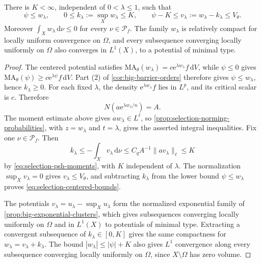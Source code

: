 \begin{lemma}\label{lem:selection-centered-bounds}
There is $K<\infty$, independent of $0<\lambda\leq1$, such that
\begin{equation}\label{eq:selection-centered-bounds}
 \psi\leq w_\lambda,\qquad
 0\leq k_\lambda:=\sup_Xw_\lambda\leq K,\qquad
 \psi-K\leq v_\lambda:=w_\lambda-k_\lambda\leq V_\theta.
\end{equation}
Moreover $\int_Xw_\lambda\,\mathrm{d}\nu\leq0$ for every $\nu\in\mathcal P_f$. The family $w_\lambda$ is relatively compact for locally uniform convergence on $\Omega$, and every subsequence converging locally uniformly on $\Omega$ also converges in $L^1(X)$, to a potential of minimal type.
\end{lemma}
\begin{proof}
The centered potential satisfies $\mathrm{MA}_\theta(w_\lambda)=c\mathrm{e}^{\lambda w_\lambda}f\,\mathrm{d}V$, while $\psi\leq0$ gives $\mathrm{MA}_\theta(\psi)\geq c\mathrm{e}^{\lambda\psi}f\,\mathrm{d}V$. Part (2) of \cref{cor:big-barrier-orders} therefore gives $\psi\leq w_\lambda$, hence $k_\lambda\geq0$. For each fixed $\lambda$, the density $\mathrm{e}^{\lambda w_\lambda}f$ lies in $L^p$, and its critical scalar is $c$. Therefore
\[
 N(a\mathrm{e}^{\lambda w_\lambda/n})=A.
\]
The moment estimate above gives $aw_\lambda\in L^\ell$, so \cref{prop:selection-norming-probabilities}, with $z=w_\lambda$ and $t=\lambda$, gives the asserted integral inequalities. Fix one $\nu\in\mathcal P_f$. Then
\[
 k_\lambda\leq-\int_Xv_\lambda\,\mathrm{d}\nu
       \leq C_q A^{-1}\|a v_\lambda\|_\ell\leq K
\]
by \eqref{eq:selection-psh-moments}, with $K$ independent of $\lambda$. The normalization $\sup_Xv_\lambda=0$ gives $v_\lambda\leq V_\theta$, and subtracting $k_\lambda$ from the lower bound $\psi\leq w_\lambda$ proves \eqref{eq:selection-centered-bounds}.

The potentials $v_\lambda=u_\lambda-\sup_Xu_\lambda$ form the normalized exponential family of \cref{prop:big-exponential-clusters}, which gives subsequences converging locally uniformly on $\Omega$ and in $L^1(X)$ to potentials of minimal type. Extracting a convergent subsequence of $k_\lambda\in[0,K]$ gives the same compactness for $w_\lambda=v_\lambda+k_\lambda$. The bound $|w_\lambda|\leq|\psi|+K$ also gives $L^1$ convergence along every subsequence converging locally uniformly on $\Omega$, since $X\setminus\Omega$ has zero volume.
\end{proof}

